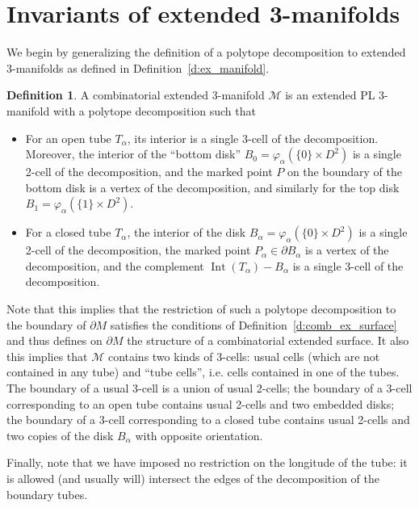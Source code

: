 \documentclass{amsart}
\theoremstyle{definition}
\newtheorem{definition}[theorem]{Definition}
\theoremstyle{remark}
\numberwithin{equation}{section}
\newcommand{\deref}[1]{Definition~{\rm\ref{#1}}}
\newcommand{\del}{\partial}
\newcommand{\<}{\langle}
\renewcommand{\>}{\rangle}
\newcommand{\M}{\mathcal{M}}      %
\newcommand{\al}{\alpha}
\newcommand{\ph}{\varphi}
\DeclareMathOperator{\Int}{Int}
\begin{document}
\section{Invariants of  extended  3-manifolds}\label{s:ext_mfds}
We begin by generalizing the definition of a polytope decomposition to
extended 3-manifolds as defined in \deref{d:ex_manifold}.

\begin{definition}\label{d:comb_ex_manifold}
 A combinatorial extended 3-manifold $\M$ is  an extended PL 3-manifold
  with a polytope decomposition such that

  \begin{itemize}
   \item For an open tube $T_\al$, its interior is a single 3-cell of the
    decomposition. Moreover, the interior of the  ``bottom disk''
    $B_0=\ph_\al(\{0\}\times D^2)$ is a single 2-cell of the decomposition,
    and the marked point $P$ on the boundary of the bottom disk is a
    vertex of the decomposition, and similarly for the top disk
    $B_1=\ph_\al(\{1\}\times D^2)$.

   \item For a closed tube $T_\al$, the interior of the  disk
    $B_\al=\ph_\al(\{0\}\times D^2)$ is a single 2-cell of the
    decomposition, the marked point $P_\al\in \del B_\al$ is a vertex of
    the decomposition, and the complement $\Int(T_\al)-B_\al$ is
    a single 3-cell of the decomposition.

  \end{itemize}
\end{definition}

Note that this implies that the restriction of such a polytope
decomposition to the boundary of $\del M$ satisfies the conditions of
\deref{d:comb_ex_surface} and thus defines on $\del M$ the structure of a
combinatorial extended surface. It also this implies that $\M$
contains two kinds of 3-cells: usual cells (which are not contained in any
tube) and ``tube cells'', i.e. cells contained in one of the tubes. The
boundary of a usual 3-cell is a union of usual 2-cells; the boundary of a
 3-cell corresponding to an open  tube contains usual 2-cells and two
embedded disks;
the boundary of a  3-cell corresponding to a closed tube contains usual
2-cells and two copies of the disk $B_\al$ with opposite orientation. 

Finally, note that we have imposed no restriction on the longitude of the
tube: it is allowed (and usually will) intersect the edges of the
decomposition of the boundary tubes. 
\end{document}

